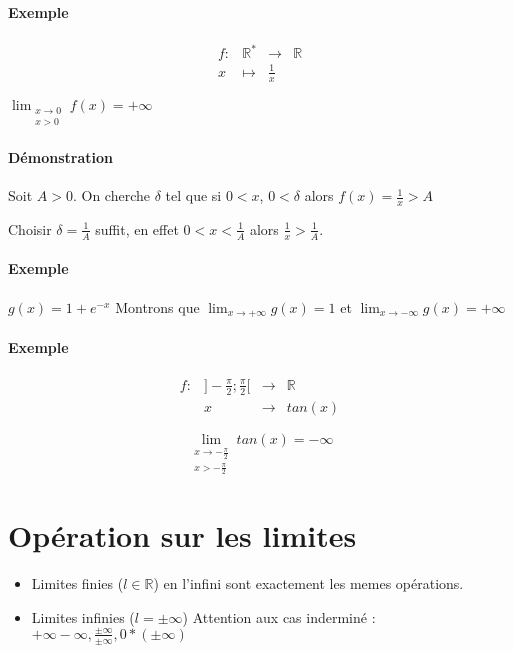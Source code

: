 \paragraph{Exemple}

\[\begin{array}{rccl}
	f:& \mathbb{R}^* &\rightarrow & \mathbb{R} \\
	x&\mapsto& \frac{1}{x}
\end{array}\]

$\lim_{\substack{x \to 0 \\ x > 0}} f(x) = +\infty$
\paragraph{Démonstration} Soit $A>0$. On cherche $\delta$ tel que si $0<x$, $0<\delta$ alors $f(x) = \frac{1}{x} > A$

Choisir $\delta = \frac{1}{A}$ suffit, en effet $0<x<\frac{1}{A}$ alors $\frac{1}{x} > \frac{1}{A}$.

\paragraph{Exemple}
$g(x) = 1+e^{-x}$ Montrons que $\lim_{x \to +\infty} g(x) = 1$ et $\lim_{x \to -\infty}g(x) = +\infty$

\paragraph{Exemple}
\[\begin{array}{rccl}
f:& ]-\frac{\pi}{2}; \frac{\pi}{2}[ &\rightarrow & \mathbb{R} \\
  &	x&\rightarrow& tan(x)
\end{array}\]

\[\lim_{\substack{x \to -\frac{\pi}{2} \\  x > - \frac{\pi}{2}}} tan(x) = -\infty\]

\section{Opération sur les limites}
\begin{itemize}
	\item Limites finies ($l\in \mathbb{R}$) en l'infini sont exactement les memes opérations.
	\item Limites infinies ($l = \pm \infty$) Attention aux cas inderminé :
		~\\
		$+\infty - \infty, \frac{\pm \infty}{\pm\infty}, 0*(\pm\infty)$
\end{itemize}

